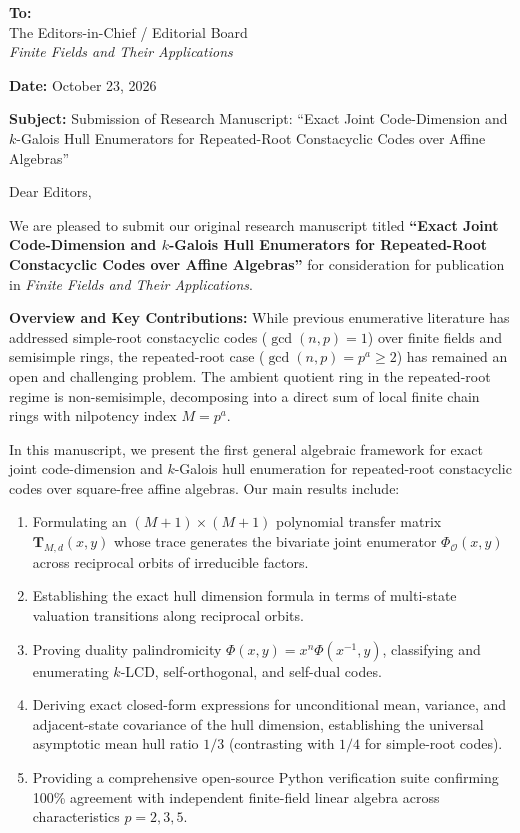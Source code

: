 \documentclass[11pt]{article}
\begin{document}
\noindent\textbf{To:}\\
The Editors-in-Chief / Editorial Board\\
\textit{Finite Fields and Their Applications}

\vspace{1em}
\noindent\textbf{Date:} October 23, 2026

\vspace{1em}
\noindent\textbf{Subject:} Submission of Research Manuscript: ``Exact Joint Code-Dimension and $k$-Galois Hull Enumerators for Repeated-Root Constacyclic Codes over Affine Algebras''

\vspace{1.5em}
\noindent Dear Editors,

We are pleased to submit our original research manuscript titled \textbf{``Exact Joint Code-Dimension and $k$-Galois Hull Enumerators for Repeated-Root Constacyclic Codes over Affine Algebras''} for consideration for publication in \textit{Finite Fields and Their Applications}.

\vspace{1em}
\noindent\textbf{Overview and Key Contributions:}
While previous enumerative literature has addressed simple-root constacyclic codes ($\gcd(n, p) = 1$) over finite fields and semisimple rings, the repeated-root case ($\gcd(n, p) = p^a \ge 2$) has remained an open and challenging problem. The ambient quotient ring in the repeated-root regime is non-semisimple, decomposing into a direct sum of local finite chain rings with nilpotency index $M = p^a$. 

In this manuscript, we present the first general algebraic framework for exact joint code-dimension and $k$-Galois hull enumeration for repeated-root constacyclic codes over square-free affine algebras. Our main results include:
\begin{enumerate}
    \item Formulating an $(M+1) \times (M+1)$ polynomial transfer matrix $\mathbf{T}_{M, d}(x, y)$ whose trace generates the bivariate joint enumerator $\Phi_{\mathcal{O}}(x, y)$ across reciprocal orbits of irreducible factors.
    \item Establishing the exact hull dimension formula in terms of multi-state valuation transitions along reciprocal orbits.
    \item Proving duality palindromicity $\Phi(x, y) = x^n \Phi(x^{-1}, y)$, classifying and enumerating $k$-LCD, self-orthogonal, and self-dual codes.
    \item Deriving exact closed-form expressions for unconditional mean, variance, and adjacent-state covariance of the hull dimension, establishing the universal asymptotic mean hull ratio $1/3$ (contrasting with $1/4$ for simple-root codes).
    \item Providing a comprehensive open-source Python verification suite confirming 100\% agreement with independent finite-field linear algebra across characteristics $p=2, 3, 5$.
\end{enumerate}
\end{document}
